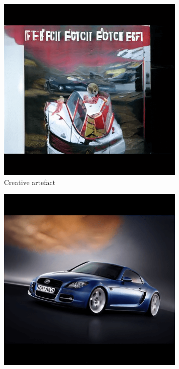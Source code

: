\begin{figure}
\centering
\begin{subfigure}{.3\textwidth}
  \centering
  \includegraphics[width=\textwidth]{images/single1.png}
  \caption{Creative artefact}
  \label{fig:survey_creative_artefact}
\end{subfigure}%
\hspace{.02\textwidth}
\begin{subfigure}{.3\textwidth}
  \centering
  \includegraphics[width=\textwidth]{images/single6.png}

\end{subfigure}
\end{figure}
